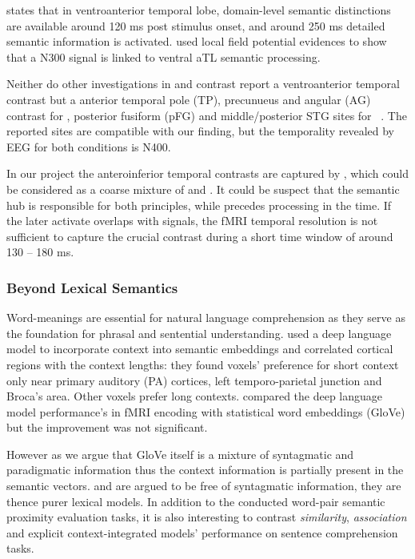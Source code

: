 \textcite{ralphNeuralComputationalBases2017} states that in ventroanterior temporal lobe, domain-level semantic distinctions are available around 120 ms post stimulus onset, and around 250 ms detailed semantic information is activated. \textcite{shimotakeDirectExplorationRole2015} used local field potential evidences to show that a N300 signal is linked to ventral aTL semantic processing. 

Neither do other investigations in \similarity and \association contrast report a ventroanterior temporal contrast but a anterior temporal pole (TP), precunueus and angular (AG) contrast for \similarity, posterior fusiform (pFG) and middle/posterior STG sites for \association~\parencite{kutasBrainPotentialsReading1984, frankWordPredictabilitySemantic2017}. The reported sites are compatible with our finding, but the temporality revealed by EEG for both conditions is N400. 

In our project the anteroinferior temporal contrasts are captured by , which could be considered as a coarse mixture of \similarity and \association. It could be suspect that the semantic hub is responsible for both principles, while \similarity precedes \association processing in the time. If the later \association activate overlaps with \similarity signals, the fMRI temporal resolution is not sufficient to capture the crucial contrast during a short time window of around 130 -- 180 ms.

\subsubsection{Beyond Lexical Semantics}

Word-meanings are essential for natural language comprehension as they serve as the foundation for phrasal and sentential understanding. \textcite{jainIncorporatingContextLanguage2018} used a deep language model to incorporate context into semantic embeddings and correlated cortical regions with the context lengths: they found voxels' preference for short context only near primary auditory (PA) cortices, left temporo-parietal junction and Broca's area. Other voxels prefer long contexts. \textcite{verdierEncodageActiviteNeuronale2018} compared the deep language model performance's in fMRI encoding with statistical word embeddings (GloVe) but the improvement was not significant.

However as we argue that GloVe itself is a mixture of syntagmatic and paradigmatic information thus the context information is partially present in the semantic vectors.  and  are argued to be free of syntagmatic information, they are thence purer lexical models. In addition to the conducted word-pair semantic proximity evaluation tasks, it is also interesting to contrast \emph{similarity}, \emph{association} and explicit context-integrated models' performance on sentence comprehension tasks.

